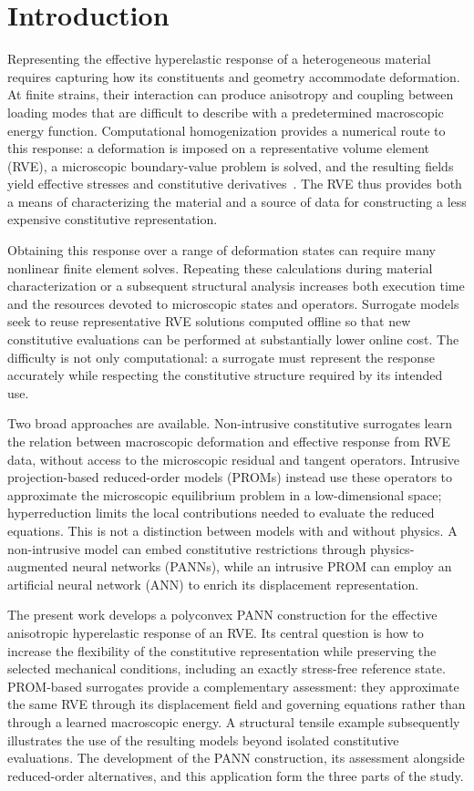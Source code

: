 \section{Introduction}
\label{sec:intro}
Representing the effective hyperelastic response of a heterogeneous material requires capturing how its constituents and geometry accommodate deformation. At finite strains, their interaction can produce anisotropy and coupling between loading modes that are difficult to describe with a predetermined macroscopic energy function. Computational homogenization provides a numerical route to this response: a deformation is imposed on a representative volume element (RVE), a microscopic boundary-value problem is solved, and the resulting fields yield effective stresses and constitutive derivatives~\cite{Miehe1999}. The RVE thus provides both a means of characterizing the material and a source of data for constructing a less expensive constitutive representation.

Obtaining this response over a range of deformation states can require many nonlinear finite element solves. Repeating these calculations during material characterization or a subsequent structural analysis increases both execution time and the resources devoted to microscopic states and operators. Surrogate models seek to reuse representative RVE solutions computed offline so that new constitutive evaluations can be performed at substantially lower online cost. The difficulty is not only computational: a surrogate must represent the response accurately while respecting the constitutive structure required by its intended use.

Two broad approaches are available. Non-intrusive constitutive surrogates learn the relation between macroscopic deformation and effective response from RVE data, without access to the microscopic residual and tangent operators. Intrusive projection-based reduced-order models (PROMs) instead use these operators to approximate the microscopic equilibrium problem in a low-dimensional space; hyperreduction limits the local contributions needed to evaluate the reduced equations. This is not a distinction between models with and without physics. A non-intrusive model can embed constitutive restrictions through physics-augmented neural networks (PANNs), while an intrusive PROM can employ an artificial neural network (ANN) to enrich its displacement representation.

The present work develops a polyconvex PANN construction for the effective anisotropic hyperelastic response of an RVE. Its central question is how to increase the flexibility of the constitutive representation while preserving the selected mechanical conditions, including an exactly stress-free reference state. PROM-based surrogates provide a complementary assessment: they approximate the same RVE through its displacement field and governing equations rather than through a learned macroscopic energy. A structural tensile example subsequently illustrates the use of the resulting models beyond isolated constitutive evaluations. The development of the PANN construction, its assessment alongside reduced-order alternatives, and this application form the three parts of the study.

